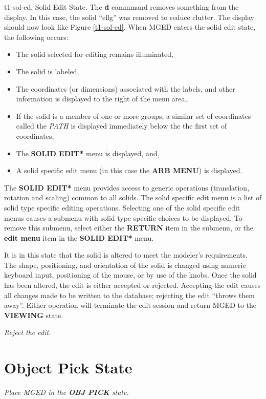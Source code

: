 \mfig t1-sol-ed, Solid Edit State.
The {\bf d} commmand removes something from the display.  In this
case, the solid ``ellg'' was removed to reduce clutter.
The display should now look like Figure \ref{t1-sol-ed}.
When MGED enters the solid edit state, the following occurs:
\begin{itemize}
\item The solid selected for editing remains illuminated,
\item The solid is labeled,
\item The coordinates (or dimensions) associated with the labels,
and other information is displayed to the right of the menu area,.
\item If the solid is a member of one or more groups, a similar set
of coordinates called the {\sl PATH} is displayed immediately below
the the first set of coordinates,
\item The {\bf *SOLID EDIT*} menu is displayed, and,
\item A solid specific edit menu (in this case the {\bf ARB MENU})
is displayed.
\end{itemize}

The {\bf *SOLID EDIT*} menu provides access to generic operations (translation, rotation
and scaling) common to all solids.
The solid specific edit menu is a list of solid type specific editing operations.
Selecting one of the solid specific edit menus causes a submenu with solid type specific
choices to be displayed.  To remove this submenu, select either the
{\bf RETURN} item in the submenu, or the {\bf edit menu} item in the
{\bf *SOLID EDIT*} menu.

It is in this state that the solid is altered to meet the modeler's
requirements. The shape, positioning, and orientation of the solid is
changed using numeric keyboard input, positioning of the mouse, or by
use of the knobs.  Once the solid has been altered, the edit is
either accepted or rejected.  Accepting the edit causes all changes
made to be written to the database; rejecting the edit ``throws them
away''. Either operation will terminate the edit session and return MGED
to the {\bf VIEWING} state.

\noindent
{\em Reject the edit.}\\

\section{Object Pick State}

\noindent
{\em Place MGED in the {\bf OBJ PICK} state.}\\


